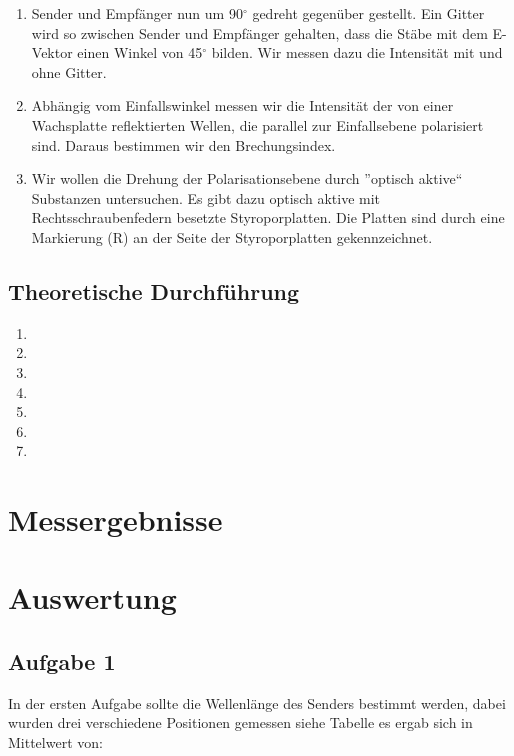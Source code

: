 \documentclass[12pt]{scrartcl}
\begin{document}
\begin{enumerate}
\item Sender und Empfänger nun um 90$^{\circ}$ gedreht gegenüber gestellt. Ein Gitter wird so zwischen Sender und Empfänger gehalten, dass die Stäbe mit dem E-Vektor einen Winkel von 45$^{\circ}$ bilden. Wir messen dazu die Intensität mit und ohne Gitter.

\item Abhängig vom Einfallswinkel messen wir die Intensität der von einer Wachsplatte reflektierten Wellen, die parallel zur Einfallsebene polarisiert sind. Daraus bestimmen wir den Brechungsindex.

\item Wir wollen die Drehung der Polarisationsebene durch ”optisch aktive“ Substanzen untersuchen. Es gibt dazu optisch aktive mit Rechtsschraubenfedern besetzte Styroporplatten. Die Platten sind durch eine Markierung (R) an der Seite der Styroporplatten gekennzeichnet.
\end{enumerate}

\subsection{Theoretische Durchführung}

\begin{enumerate}
\item
\item
\item
\item
\item
\item
\item
\end{enumerate}

\section{Messergebnisse}



\section{Auswertung}

\subsection{Aufgabe 1}
In der ersten Aufgabe sollte die Wellenlänge des Senders bestimmt werden, dabei wurden drei verschiedene Positionen gemessen siehe Tabelle  %
es ergab sich in Mittelwert von:
\end{document}
